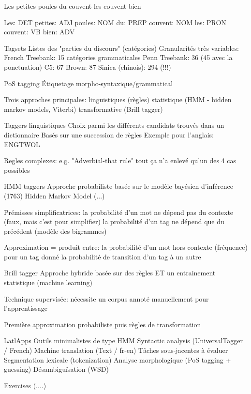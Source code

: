     Les petites poules du couvent les couvent bien

    Les: DET
    petites: ADJ
    poules: NOM
    du: PREP
    couvent: NOM
    les: PRON
    couvent: VB
    bien: ADV

Tagsets
    Listes des "parties du discours" (catégories)
    Granularités très variables:
        French Treebank: 15 catégories grammaticales
        Penn Treebank: 36 (45 avec la ponctuation)
        C5: 67
        Brown: 87
        Sinica (chinois): 294 (!!!)

PoS tagging
    Étiquetage morpho-syntaxique/grammatical

    Trois approches principales:
        linguistiques (règles)
        statistique (HMM - hidden markov models, Viterbi)
        transformative (Brill tagger)

Taggers linguistiques
    Choix parmi les différents candidats trouvés dans un dictionnaire
    Basés sur une succession de règles
    Exemple pour l'anglais: ENGTWOL

    Regles complexes:
    e.g. "Adverbial-that rule"
    tout ça n'a enlevé qu'un des 4 cas possibles


HMM taggers
    Approche probabiliste basée sur le modèle bayésien d'inférence (1763)
    Hidden Markov Model
    (...)

    Prémisses simplificatrices:
        la probabilité d'un mot ne dépend pas du contexte (faux, mais c'est pour simplifier)
        la probabilité d'un tag ne dépend que du précédent (modèle des bigrammes)

    Approximation = produit entre:
        la probabilité d'un mot hors contexte (fréquence) pour un tag donné
        la probabilité de transition d'un tag à un autre


Brill tagger
    Approche hybride basée sur des règles ET un entrainement statistique (machine learning)

    Technique supervisée: nécessite un corpus annoté manuellement pour l'apprentissage

    Première approximation probabiliste puis règles de transformation

LatlApps
    Outils minimalistes de type HMM
        Syntactic analysis (UniversalTagger / French)
        Machine translation (Text / fr-en)
    Tâches sous-jacentes à évaluer
        Segmentation lexicale (tokenization)
        Analyse morphologique (PoS tagging + guessing)
        Désambiguïsation (WSD)

Exercises
    (....)

